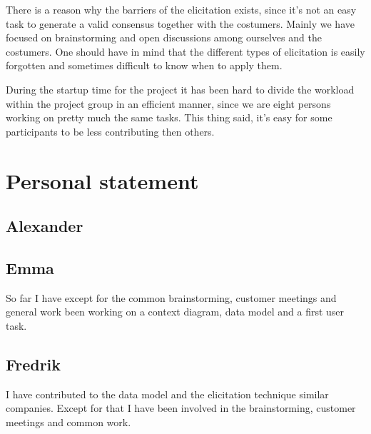 \documentclass[a4paper]{article}
\begin{document}


	There is a reason why the barriers of the elicitation exists, since it's not an easy task to generate a valid consensus together with the costumers.
	Mainly we have focused on brainstorming and open discussions among ourselves and the costumers. One should have in mind that the different types of elicitation is easily forgotten and sometimes difficult to know when to apply them.
  
 	During the startup time for the project it has been hard to divide the workload within the project group in an efficient manner, since we are eight persons working on pretty much the same tasks. This thing said, it's easy for some participants to be less contributing then others.



  \section{Personal statement}
  
  \subsection{Alexander}
  \subsection{Emma}
	So far I have except for the common brainstorming, customer meetings and general work been working on a context diagram, data model and a first user task.	
  \subsection{Fredrik}
  	I have contributed to the data model and the elicitation technique similar companies. Except for that I have been involved in the brainstorming, customer meetings and common work. 
\end{document}
